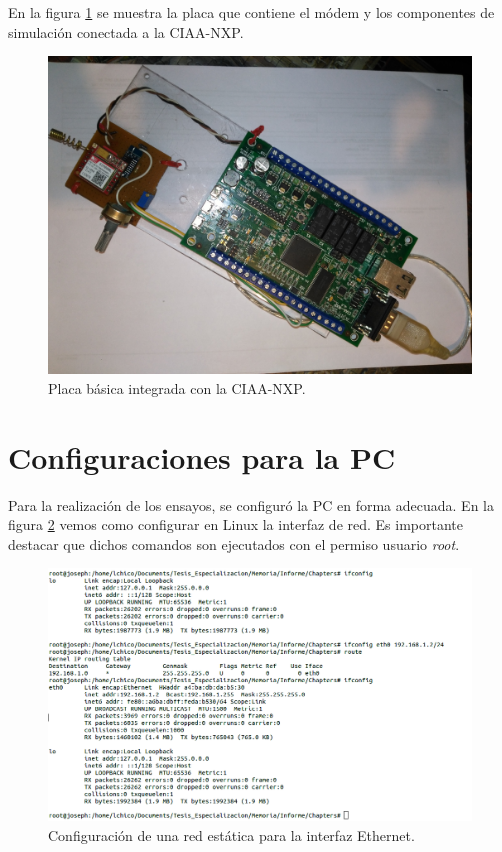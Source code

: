 En la figura \ref{fig:prototipo} se muestra la placa que contiene el módem y los componentes de simulación conectada a la CIAA-NXP. 

\begin{figure}[h]
  \centering
  \includegraphics[scale=.1]{./Figures/prototipo.jpg}
  \caption{Placa básica integrada con la CIAA-NXP.}
  \label{fig:prototipo}
\end{figure}

\section{Configuraciones para la PC}

Para la realización de los ensayos, se configuró la PC en forma adecuada. En la figura \ref{fig:hw_pc} vemos como configurar en Linux la interfaz de red. Es importante destacar que dichos comandos son ejecutados con el permiso usuario \emph{root}.

\begin{figure}[h]
  \centering
  \includegraphics[scale=.45]{./Figures/config_net_console.png}
  \caption{Configuración de una red estática para la interfaz Ethernet.}
  \label{fig:hw_pc}
\end{figure}

